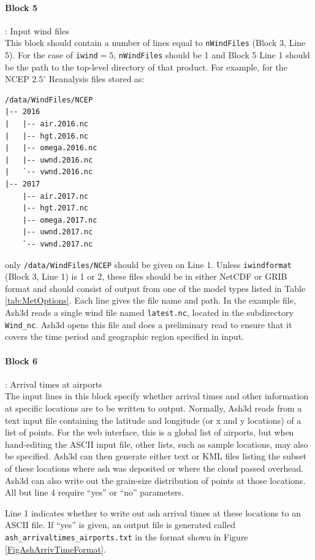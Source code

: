\paragraph{Block 5}: Input wind files\\
This block should contain a number of lines equal to \texttt{nWindFiles} (Block 3, Line 5).
For the case of \texttt{iwind}$=5$, \texttt{nWindFiles} should be 1 and Block 5 Line 1
should be the path to the top-level directory of that product. For example, for the
NCEP $2.5^{\circ}$ Reanalysis files stored as:
\begin{verbatim}
/data/WindFiles/NCEP
|-- 2016
|   |-- air.2016.nc
|   |-- hgt.2016.nc
|   |-- omega.2016.nc
|   |-- uwnd.2016.nc
|   `-- vwnd.2016.nc
|-- 2017
    |-- air.2017.nc
    |-- hgt.2017.nc
    |-- omega.2017.nc
    |-- uwnd.2017.nc
    `-- vwnd.2017.nc
\end{verbatim}
only \texttt{/data/WindFiles/NCEP} should be given on Line 1.
Unless \texttt{iwindformat} (Block 3, Line 1) is 1 or 2, these files should be in
either NetCDF or GRIB
format and should consist of output from one of the model types listed in
Table \ref{tab:MetOptions}.
Each line gives the file name and path. In the example file, Ash3d reads a single
wind file named \texttt{latest.nc}, located in the subdirectory \texttt{Wind\_nc}.
Ash3d opens this
file and does a preliminary read to ensure that it covers the time period and
geographic region specified in input.

\paragraph{Block 6}: Arrival times at airports\\
The input lines in this block specify whether arrival times and other information
at specific locations are to be written to output. Normally, Ash3d reads from a
text input file containing the latitude and longitude (or x and y locations) of
a list of points. For the web interface, this is a global list of airports, but
when hand-editing the ASCII input file, other lists, such as sample locations, may
also be specified. Ash3d can then generate either text or KML files listing the
subset of these locations where ash was deposited or where the cloud passed overhead.
Ash3d can also write out the grain-size distribution of points at those locations.
All but line 4 require ``yes'' or ``no'' parameters.

Line 1 indicates whether to write out ash arrival times at these locations to an
ASCII file. If ``yes'' is given, an output file is generated called
\texttt{ash\_arrivaltimes\_airports.txt}
in the format shown in Figure \ref{FigAshArrivTimeFormat}.

